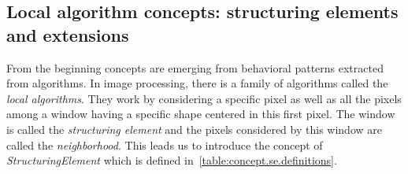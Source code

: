 \subsection{Local algorithm concepts: structuring elements and extensions}
\label{subsec:local.se.ext}


From the beginning concepts are emerging from behavioral patterns extracted from algorithms. In image processing, there
is a family of algorithms called the \emph{local algorithms}. They work by considering a specific pixel as well as all
the pixels among a window having a specific shape centered in this first pixel. The window is called the
\emph{structuring element} and the pixels considered by this window are called the \emph{neighborhood}. This leads us to
introduce the concept of \emph{StructuringElement} which is defined in~\cref{table:concept.se.definitions}.

